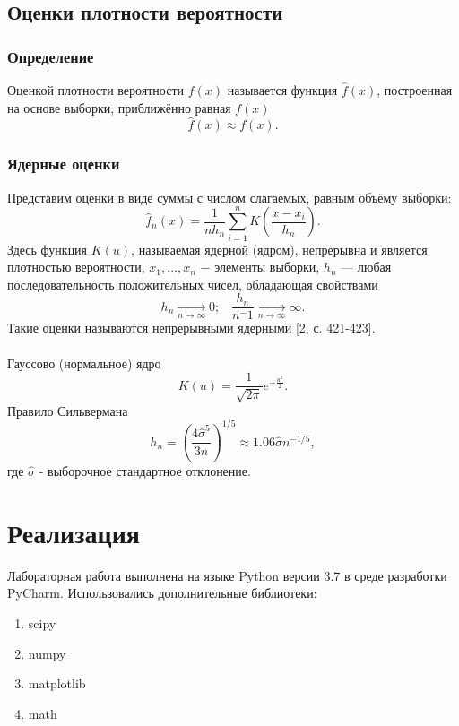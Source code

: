 \documentclass[a4paper]{article}
\begin{document}
	\subsection{Оценки плотности вероятности}
	\subsubsection{Определение}
	\noindent Оценкой плотности вероятности $f(x)$ называется функция $\widehat{f}(x)$, построенная на основе выборки, приближённо равная $f(x)$
    \begin{equation}
        \widehat{f}(x)\approx f(x).
    \end{equation}
	\subsubsection{Ядерные оценки}
	\noindent Представим оценки в виде суммы с числом слагаемых, равным объёму выборки:\begin{equation}
        \widehat{f}_n(x)=\frac{1}{n h_n}\sum_{i=1}^n K\left(\frac{x-x_i}{h_n}\right).
    \end{equation}
    Здесь функция $K(u)$, называемая ядерной (ядром), непрерывна и является плотностью вероятности, $x_1,...,x_n$ $-$ элементы выборки, ${h_n}$ — любая последовательность положительных чисел, обладающая свойствами
    \begin{equation}
        h_n\xrightarrow[n\to\infty]{}0;\;\;\;\frac{h_n}{n^-1} \xrightarrow[n\to\infty]{}\infty.
    \end{equation}
    Такие оценки называются непрерывными ядерными [2, с. 421-423].\\\\
    Гауссово (нормальное) ядро
    \begin{equation}
        K(u)=\frac{1}{\sqrt{2\pi}}e^{-\frac{u^2}{2}}.
    \end{equation}
    Правило Сильвермана
    \begin{equation}
        h_n=\left(\frac{4\hat{\sigma}^5}{3n}\right)^{1/5}\approx1.06\hat{\sigma}n^{-1/5},
    \end{equation}
    где $\hat{\sigma}$ - выборочное стандартное отклонение.

\section {Реализация} 	
\noindent Лабораторная работа выполнена на языке Python версии 3.7 в среде разработки PyCharm. Использовались дополнительные библиотеки:
\begin{enumerate}
    \item scipy
    \item numpy
    \item matplotlib
    \item math
\end{enumerate}
\end{document}
